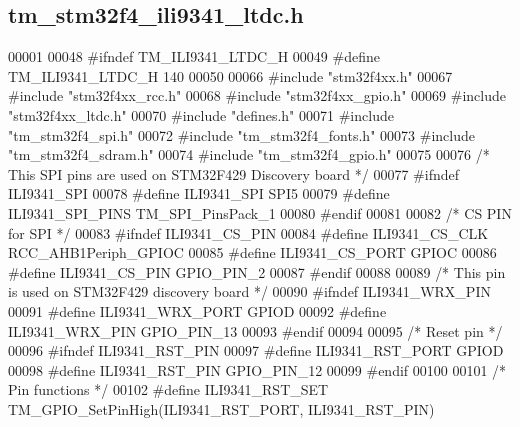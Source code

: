 \hypertarget{tm__stm32f4__ili9341__ltdc_8h_source}{}\subsection{tm\+\_\+stm32f4\+\_\+ili9341\+\_\+ltdc.\+h}

\begin{DoxyCode}
00001 
00048 \textcolor{preprocessor}{#ifndef TM\_ILI9341\_LTDC\_H}
00049 \textcolor{preprocessor}{#define TM\_ILI9341\_LTDC\_H 140}
00050 
00066 \textcolor{preprocessor}{#include "stm32f4xx.h"}
00067 \textcolor{preprocessor}{#include "stm32f4xx\_rcc.h"}
00068 \textcolor{preprocessor}{#include "stm32f4xx\_gpio.h"}
00069 \textcolor{preprocessor}{#include "stm32f4xx\_ltdc.h"}
00070 \textcolor{preprocessor}{#include "defines.h"}
00071 \textcolor{preprocessor}{#include "tm\_stm32f4\_spi.h"}
00072 \textcolor{preprocessor}{#include "tm\_stm32f4\_fonts.h"}
00073 \textcolor{preprocessor}{#include "tm\_stm32f4\_sdram.h"}
00074 \textcolor{preprocessor}{#include "tm\_stm32f4\_gpio.h"}
00075 
00076 \textcolor{comment}{/* This SPI pins are used on STM32F429 Discovery board */}
00077 \textcolor{preprocessor}{#ifndef ILI9341\_SPI}
00078 \textcolor{preprocessor}{#define ILI9341\_SPI                 SPI5}
00079 \textcolor{preprocessor}{#define ILI9341\_SPI\_PINS            TM\_SPI\_PinsPack\_1}
00080 \textcolor{preprocessor}{#endif}
00081 
00082 \textcolor{comment}{/* CS PIN for SPI */}
00083 \textcolor{preprocessor}{#ifndef ILI9341\_CS\_PIN}
00084 \textcolor{preprocessor}{#define ILI9341\_CS\_CLK              RCC\_AHB1Periph\_GPIOC}
00085 \textcolor{preprocessor}{#define ILI9341\_CS\_PORT             GPIOC}
00086 \textcolor{preprocessor}{#define ILI9341\_CS\_PIN              GPIO\_PIN\_2}
00087 \textcolor{preprocessor}{#endif}
00088 
00089 \textcolor{comment}{/* This pin is used on STM32F429 discovery board */}
00090 \textcolor{preprocessor}{#ifndef ILI9341\_WRX\_PIN}
00091 \textcolor{preprocessor}{#define ILI9341\_WRX\_PORT            GPIOD}
00092 \textcolor{preprocessor}{#define ILI9341\_WRX\_PIN             GPIO\_PIN\_13}
00093 \textcolor{preprocessor}{#endif}
00094 
00095 \textcolor{comment}{/* Reset pin */}
00096 \textcolor{preprocessor}{#ifndef ILI9341\_RST\_PIN}
00097 \textcolor{preprocessor}{#define ILI9341\_RST\_PORT            GPIOD}
00098 \textcolor{preprocessor}{#define ILI9341\_RST\_PIN             GPIO\_PIN\_12}
00099 \textcolor{preprocessor}{#endif}
00100 
00101 \textcolor{comment}{/* Pin functions */}
00102 \textcolor{preprocessor}{#define ILI9341\_RST\_SET             TM\_GPIO\_SetPinHigh(ILI9341\_RST\_PORT, ILI9341\_RST\_PIN)}

\end{DoxyCode}
